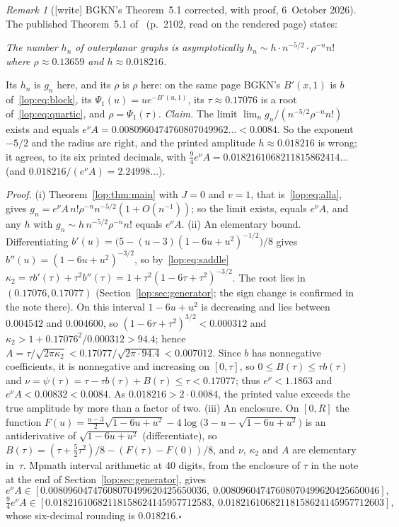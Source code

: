\documentclass[11pt,letterpaper]{article}
\numberwithin{equation}{section}
\theoremstyle{remark}\newtheorem{remark}[theorem]{Remark}
\begin{document}
\begin{remark}[{[write]} BGKN's Theorem~5.1 corrected, with proof, 6~October 2026]\label{lop:rem:bgkn}
The published Theorem~5.1 of~\cite{bgkn} (p.~2102, read on the rendered
page) states:
\begin{center}\small
\parbox{0.92\textwidth}{\emph{The number $h_n$ of outerplanar graphs is
asymptotically $h_n\sim h\cdot n^{-5/2}\cdot\rho^{-n}n!$ where
$\rho\approx0.13659$ and $h\approx0.018216$.}}
\end{center}
Its $h_n$ is $g_n$ here, and its $\rho$ is $\rho$ here: on the same page
BGKN's $B'(x,1)$ is $b$ of~\eqref{lop:eq:block}, its $\Psi_1(u)=ue^{-B'(u,1)}$,
its $\tau\approx0.17076$ is a root of~\eqref{lop:eq:quartic}, and
$\rho=\Psi_1(\tau)$.
\emph{Claim.} The limit $\lim_n g_n/(n^{-5/2}\rho^{-n}n!)$ exists and equals
$e^\nu A=0.0080960474760807049962\ldots<0.0084$. So the exponent $-5/2$ and
the radius are right, and the printed amplitude $h\approx0.018216$ is
wrong; it agrees, to its six printed decimals, with
$\tfrac94e^\nu A=0.0182161068211815862414\ldots$ (and
$0.018216/(e^\nu A)=2.24998\ldots$).

\emph{Proof.} (i) Theorem~\ref{lop:thm:main} with $J=0$ and $v=1$,
that is~\eqref{lop:eq:alla}, gives
$g_n=e^\nu A\,n!\rho^{-n}n^{-5/2}(1+O(n^{-1}))$; so the limit exists, equals
$e^\nu A$, and any $h$ with $g_n\sim h\,n^{-5/2}\rho^{-n}n!$ equals $e^\nu A$.
(ii) An elementary bound. Differentiating
$b'(u)=\bigl(5-(u-3)(1-6u+u^2)^{-1/2}\bigr)/8$ gives
$b''(u)=(1-6u+u^2)^{-3/2}$, so by~\eqref{lop:eq:saddle}
$\kappa_2=\tau b'(\tau)+\tau^2b''(\tau)=1+\tau^2(1-6\tau+\tau^2)^{-3/2}$. The
root lies in $(0.17076,0.17077)$ (Section~\ref{lop:sec:generator}; the sign
change is confirmed in the note there). On this interval $1-6u+u^2$ is
decreasing and lies between $0.004542$ and $0.004600$, so
$(1-6\tau+\tau^2)^{3/2}<0.000312$ and $\kappa_2>1+0.17076^2/0.000312>94.4$;
hence $A=\tau/\sqrt{2\pi\kappa_2}<0.17077/\sqrt{2\pi\cdot94.4}<0.007012$.
Since $b$ has nonnegative coefficients, it is nonnegative and increasing on
$[0,\tau]$, so $0\le B(\tau)\le\tau b(\tau)$ and
$\nu=\psi(\tau)=\tau-\tau b(\tau)+B(\tau)\le\tau<0.17077$; thus
$e^\nu<1.1863$ and $e^\nu A<0.00832<0.0084$. As $0.018216>2\cdot0.0084$, the
printed value exceeds the true amplitude by more than a factor of two.
(iii) An enclosure. On $[0,R]$ the function
$F(u)=\tfrac{u-3}2\sqrt{1-6u+u^2}-4\log\bigl(3-u-\sqrt{1-6u+u^2}\bigr)$ is an
antiderivative of $\sqrt{1-6u+u^2}$ (differentiate), so
$B(\tau)=(\tau+\tfrac52\tau^2)/8-(F(\tau)-F(0))/8$, and $\nu$, $\kappa_2$
and $A$ are elementary in~$\tau$. Mpmath interval arithmetic at 40 digits,
from the enclosure of $\tau$ in the note at the end of
Section~\ref{lop:sec:generator}, gives
\[e^\nu A\in[0.00809604747608070499620425650036,\ 0.00809604747608070499620425650046],\]
\[\tfrac94e^\nu A\in[0.01821610682118158624145957712583,\ 0.01821610682118158624145957712603],\]
whose six-decimal rounding is $0.018216$.\qquad$\square$


\end{remark}
\end{document}
